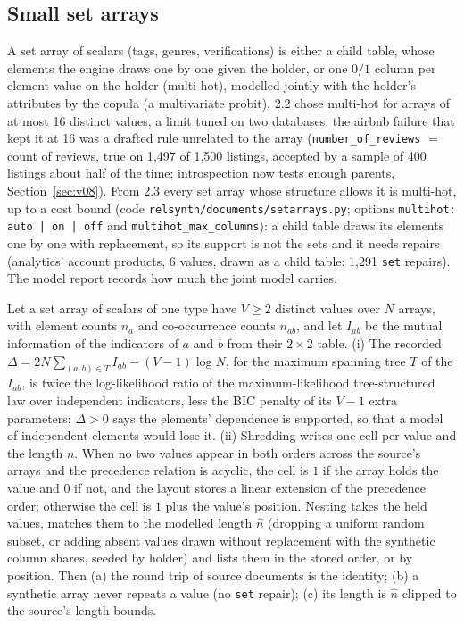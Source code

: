 \subsection*{Small set arrays}
A set array of scalars (tags, genres, verifications) is either a child table, whose elements the engine draws one by one given the holder, or one $0/1$ column per element value on the holder (multi-hot), modelled jointly with the holder's attributes by the copula (a multivariate probit). 2.2 chose multi-hot for arrays of at most 16 distinct values, a limit tuned on two databases; the airbnb failure that kept it at 16 was a drafted rule unrelated to the array (\texttt{number\_of\_reviews} $=$ count of reviews, true on 1{,}497 of 1{,}500 listings, accepted by a sample of 400 listings about half of the time; introspection now tests enough parents, Section~\ref{sec:v08}). From 2.3 every set array whose structure allows it is multi-hot, up to a cost bound (code \texttt{relsynth/documents/setarrays.py}; options \texttt{multihot: auto | on | off} and \texttt{multihot\_max\_columns}): a child table draws its elements one by one with replacement, so its support is not the sets and it needs repairs (analytics' account products, 6 values, drawn as a child table: 1{,}291 \texttt{set} repairs). The model report records how much the joint model carries.
\setcounter{proposition}{1784}
\begin{proposition}\label{prop:multihot}
Let a set array of scalars of one type have $V\ge2$ distinct values over $N$ arrays, with element counts $n_a$ and co-occurrence counts $n_{ab}$, and let $I_{ab}$ be the mutual information of the indicators of $a$ and $b$ from their $2\times2$ table. (i) The recorded $\Delta=2N\sum_{(a,b)\in T}I_{ab}-(V-1)\log N$, for the maximum spanning tree $T$ of the $I_{ab}$, is twice the log-likelihood ratio of the maximum-likelihood tree-structured law over independent indicators, less the BIC penalty of its $V-1$ extra parameters; $\Delta>0$ says the elements' dependence is supported, so that a model of independent elements would lose it. (ii) Shredding writes one cell per value and the length $n$. When no two values appear in both orders across the source's arrays and the precedence relation is acyclic, the cell is $1$ if the array holds the value and $0$ if not, and the layout stores a linear extension of the precedence order; otherwise the cell is $1$ plus the value's position. Nesting takes the held values, matches them to the modelled length $\hat n$ (dropping a uniform random subset, or adding absent values drawn without replacement with the synthetic column shares, seeded by holder) and lists them in the stored order, or by position. Then (a) the round trip of source documents is the identity; (b) a synthetic array never repeats a value (no \texttt{set} repair); (c) its length is $\hat n$ clipped to the source's length bounds.\end{proposition}
